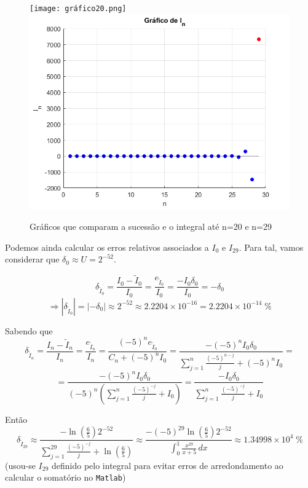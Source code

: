 \documentclass[12pt,a4paper]{article}
\begin{document}
\FloatBarrier\FloatBarrier
 \begin{figure}[ht]
        \centering
        \texttt{[image: gráfico20.png]}
        \includegraphics[scale=0.4]{grafico29novo.png}
        \caption{Gráficos que comparam a sucessão e o integral até n=20 e n=29}
        \label{gráfico}
    \end{figure}
\FloatBarrier


\noindent Podemos ainda calcular os erros relativos associados a $I_0$ e $I_{29}$. Para tal, vamos considerar que $\delta_0 \approx U = 2^{-52}$.

\[\delta_{\tilde{I}_0}=\frac{I_0-\tilde{I}_0}{I_0}=\frac{e_{\tilde{I}_0}}{I_0}=\frac{-I_0\delta_0}{I_0}=-\delta_0\]
\[\Rightarrow |\delta_{\tilde{I}_0}|=|-\delta_0|\approx 2^{-52}\approx2.2204\times10^{-16} = 2.2204\times10^{-14}\; \%\]



Sabendo que \[\delta_{\tilde{I}_{n}}=\frac{I_n-\tilde{I}_n}{I_n}=
\frac{e_{\tilde{I}_n}}{I_n}=
\frac{(-5)^ne_{\tilde{I}_{0}}}{C_n+(-5)^nI_0} = 
\frac{-(-5)^nI_0\delta_0}{\sum_{j=1}^{n} \frac{(-5)^{n-j}}{j}+(-5)^nI_0}=\]
\[
=\frac{-(-5)^nI_0\delta_0}{(-5)^n(\sum_{j=1}^{n} \frac{(-5)^{-j}}{j}+I_0)}=
\frac{-I_0\delta_0}{\sum_{j=1}^{n} \frac{(-5)^{-j}}{j}+I_0}\]

Então \[\delta_{\tilde{I}_{29}}\approx\frac{-\ln(\frac{6}{5})2^{-52}}{\sum_{j=1}^{29} \frac{(-5)^{-j}}{j}+\ln(\frac{6}{5})}\approx \frac{-(-5)^{29}\ln(\frac{6}{5})2^{-52}}{\int_{0}^{1} \frac{x^{29}}{x+5} \, dx} \approx 1.34998\times 10^4 \; \%  \]
(usou-se $I_{29}$ definido pelo integral para evitar erros de arredondamento ao calcular o somatório no \texttt{Matlab})\\
\end{document}
